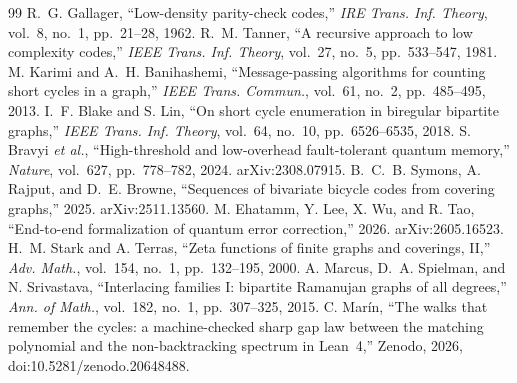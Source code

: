 \documentclass[journal]{IEEEtran}
\begin{document}
\begin{thebibliography}{99}
 R.~G. Gallager, ``Low-density parity-check codes,'' \emph{IRE Trans. Inf.
Theory}, vol.~8, no.~1, pp.~21--28, 1962.
 R.~M. Tanner, ``A recursive approach to low complexity codes,'' \emph{IEEE
Trans. Inf. Theory}, vol.~27, no.~5, pp.~533--547, 1981.
 M. Karimi and A.~H. Banihashemi, ``Message-passing algorithms for counting
short cycles in a graph,'' \emph{IEEE Trans. Commun.}, vol.~61, no.~2, pp.~485--495, 2013.
 I.~F. Blake and S. Lin, ``On short cycle enumeration in biregular bipartite
graphs,'' \emph{IEEE Trans. Inf. Theory}, vol.~64, no.~10, pp.~6526--6535, 2018.
 S. Bravyi \emph{et al.}, ``High-threshold and low-overhead fault-tolerant
quantum memory,'' \emph{Nature}, vol.~627, pp.~778--782, 2024. arXiv:2308.07915.
 B.~C.~B. Symons, A. Rajput, and D.~E. Browne, ``Sequences of bivariate bicycle
codes from covering graphs,'' 2025. arXiv:2511.13560.
 M. Ehatamm, Y. Lee, X. Wu, and R. Tao, ``End-to-end formalization of quantum
error correction,'' 2026. arXiv:2605.16523.
 H.~M. Stark and A. Terras, ``Zeta functions of finite graphs and
coverings, II,'' \emph{Adv. Math.}, vol.~154, no.~1, pp.~132--195, 2000.
 A. Marcus, D.~A. Spielman, and N. Srivastava, ``Interlacing families I: bipartite
Ramanujan graphs of all degrees,'' \emph{Ann. of Math.}, vol.~182, no.~1, pp.~307--325, 2015.
 C. Mar\'in, ``The walks that remember the cycles: a machine-checked sharp gap
law between the matching polynomial and the non-backtracking spectrum in Lean~4,'' Zenodo,
2026, doi:10.5281/zenodo.20648488.
\end{thebibliography}
\end{document}
